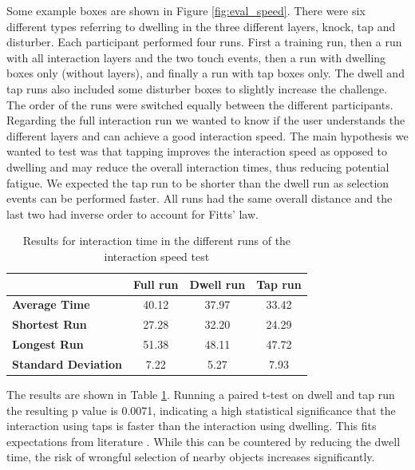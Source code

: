 Some example boxes are shown in Figure \ref{fig:eval_speed}. There were six different types referring to dwelling in the three different layers, knock, tap and disturber. Each participant performed four runs. First a training run, then a run with all interaction layers and the two touch events, then a run with dwelling boxes only (without layers), and finally a run with tap boxes only. The dwell and tap runs also included some disturber boxes to slightly increase the challenge. The order of the runs were switched equally between the different participants. Regarding the full interaction run we wanted to know if the user understands the different layers and can achieve a good interaction speed. The main hypothesis we wanted to test was that tapping improves the interaction speed as opposed to dwelling and may reduce the overall interaction times, thus reducing potential fatigue. We expected the tap run to be shorter than the dwell run as selection events can be performed faster. All runs had the same overall distance and the last two had inverse order to account for Fitts’ law.

\begin{table}[htbp]
  \centering
  \caption{Results for interaction time in the different runs of the interaction speed test}
    \begin{tabular}{lccc}
    \toprule
          & \textbf{Full run} & \textbf{Dwell run} & \textbf{Tap run} \\
    \midrule
    \textbf{Average Time} & 40.12 & 37.97 & 33.42 \\
    \textbf{Shortest Run} & 27.28 & 32.20 & 24.29 \\
    \textbf{Longest Run} & 51.38 & 48.11 & 47.72 \\
    \textbf{Standard Deviation} & 7.22 & 5.27 & 7.93 \\
    \bottomrule
    \end{tabular}%
  \label{tab:prot_captap_eval_intspeed}%
\end{table}%

The results are shown in Table \ref{tab:prot_captap_eval_intspeed}. Running a paired t-test on dwell and tap run the resulting p value is 0.0071, indicating a high statistical significance that the interaction using taps is faster than the interaction using dwelling. This fits expectations from literature \cite{lenman2002}. While this can be countered by reducing the dwell time, the risk of wrongful selection of nearby objects increases significantly.

